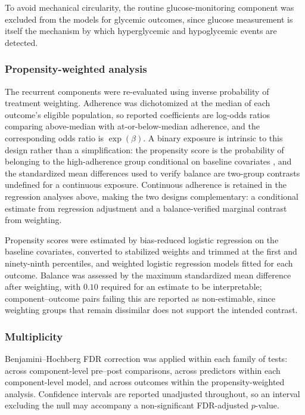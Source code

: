 To avoid mechanical circularity, the routine glucose-monitoring component
was excluded from the models for glycemic outcomes, since glucose
measurement is itself the mechanism by which hyperglycemic and hypoglycemic
events are detected.

\subsubsection{Propensity-weighted analysis}

The recurrent components were re-evaluated using inverse probability of
treatment weighting. Adherence was dichotomized at the median of each
outcome's eligible population, so reported coefficients are log-odds ratios
comparing above-median with at-or-below-median adherence, and the
corresponding odds ratio is $\exp(\beta)$. A binary exposure is intrinsic to
this design rather than a simplification: the propensity score is the
probability of belonging to the high-adherence group conditional on baseline
covariates \citep{rosenbaum1983central}, and the standardized mean
differences used to verify balance \citep{austin2009balance} are two-group
contrasts undefined for a continuous exposure. Continuous adherence is
retained in the regression analyses above, making the two designs
complementary: a conditional estimate from regression adjustment and a
balance-verified marginal contrast from weighting.

Propensity scores were estimated by bias-reduced logistic regression on the
baseline covariates, converted to stabilized weights and trimmed at the
first and ninety-ninth percentiles, and weighted logistic regression models
fitted for each outcome. Balance was assessed by the maximum standardized
mean difference after weighting, with $0.10$ required for an estimate to be
interpretable; component--outcome pairs failing this are reported as
non-estimable, since weighting groups that remain dissimilar does not
support the intended contrast.

\subsubsection{Multiplicity}

Benjamini--Hochberg FDR correction \citep{benjamini1995controlling} was
applied within each family of tests:
across component-level pre--post comparisons, across predictors within each
component-level model, and across outcomes within the propensity-weighted
analysis. Confidence intervals are reported unadjusted throughout, so an
interval excluding the null may accompany a non-significant FDR-adjusted
$p$-value.

